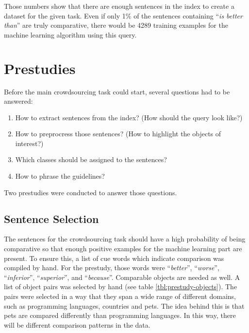 Those numbers show that there are enough sentences in the index to create a dataset for the given task. Even if only 1\% of the sentences containing \enquote{\emph{is better than}} are truly comparative, there would be 4289 training examples for the machine learning algorithm using this query.


\section{Prestudies}
Before the main crowdsourcing task could start, several questions had to be answered:
\begin{enumerate}
\item How to extract sentences from the index? (How should the query look like?)
\item How to preprocress those sentences? (How to highlight the objects of interest?)
\item Which classes should be assigned to the sentences?
\item How to phrase the guidelines?
\end{enumerate}

Two prestudies were conducted to answer those questions.



\subsection{Sentence Selection}
The sentences for the crowdsourcing task should have a high probability of being comparative so that enough positive examples for the machine learning part are present. To ensure this, a list of cue words which indicate comparison was compiled by hand. For the prestudy, those words were \enquote{\emph{better}}, \enquote{\emph{worse}}, \enquote{\emph{inferior}}, \enquote{\emph{superior}}, and \enquote{\emph{because}}. Comparable objects are needed as well. A list of object pairs was selected by hand (see table \ref{tbl:prestudy-objects}). The pairs were selected in a way that they span a wide range of different domains, such as programming languages, countries and pets. The idea behind this is that pets are compared differently than programming languages. In this way, there will be different comparison patterns in the data.

